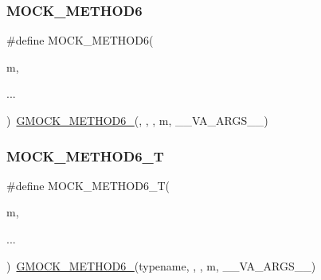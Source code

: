 \mbox{\label{_obj__test_2lib_2googletest-release-1_88_81_2googlemock_2include_2gmock_2gmock-generated-function-mockers_8h_add8f8f786444c2c85ac67f550dbde5a6}} 
\subsubsection{\texorpdfstring{MOCK\_METHOD6}{MOCK\_METHOD6}}
{\footnotesize\ttfamily \#define M\+O\+C\+K\+\_\+\+M\+E\+T\+H\+O\+D6(\begin{DoxyParamCaption}\item[{}]{m,  }\item[{}]{... }\end{DoxyParamCaption})~\mbox{\hyperlink{_obj__test_2lib_2googletest-release-1_88_81_2googlemock_2include_2gmock_2gmock-generated-function-mockers_8h_ad0ca7f6973a076d0af4c953f8ed91842}{G\+M\+O\+C\+K\+\_\+\+M\+E\+T\+H\+O\+D6\+\_\+}}(, , , m, \+\_\+\+\_\+\+V\+A\+\_\+\+A\+R\+G\+S\+\_\+\+\_\+)}

\mbox{\label{_obj__test_2lib_2googletest-release-1_88_81_2googlemock_2include_2gmock_2gmock-generated-function-mockers_8h_a0d16357a0043d36b167a1c42ef33f672}} 
\subsubsection{\texorpdfstring{MOCK\_METHOD6\_T}{MOCK\_METHOD6\_T}}
{\footnotesize\ttfamily \#define M\+O\+C\+K\+\_\+\+M\+E\+T\+H\+O\+D6\+\_\+T(\begin{DoxyParamCaption}\item[{}]{m,  }\item[{}]{... }\end{DoxyParamCaption})~\mbox{\hyperlink{_obj__test_2lib_2googletest-release-1_88_81_2googlemock_2include_2gmock_2gmock-generated-function-mockers_8h_ad0ca7f6973a076d0af4c953f8ed91842}{G\+M\+O\+C\+K\+\_\+\+M\+E\+T\+H\+O\+D6\+\_\+}}(typename, , , m, \+\_\+\+\_\+\+V\+A\+\_\+\+A\+R\+G\+S\+\_\+\+\_\+)}

